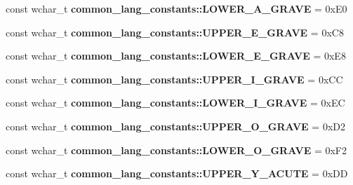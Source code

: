 \begin{DoxyCompactItemize}
\item 
\hypertarget{group___indexing_gad683b154d045922a0a5de25e7c837ec4}{const wchar\-\_\-t {\bfseries common\-\_\-lang\-\_\-constants\-::\-L\-O\-W\-E\-R\-\_\-\-A\-\_\-\-G\-R\-A\-V\-E} = 0x\-E0}\label{group___indexing_gad683b154d045922a0a5de25e7c837ec4}

\item 
\hypertarget{group___indexing_ga662a573a962fa386fa070e78055c5a67}{const wchar\-\_\-t {\bfseries common\-\_\-lang\-\_\-constants\-::\-U\-P\-P\-E\-R\-\_\-\-E\-\_\-\-G\-R\-A\-V\-E} = 0x\-C8}\label{group___indexing_ga662a573a962fa386fa070e78055c5a67}

\item 
\hypertarget{group___indexing_gad06e4b2ecd54bb7e694f66301c641c3c}{const wchar\-\_\-t {\bfseries common\-\_\-lang\-\_\-constants\-::\-L\-O\-W\-E\-R\-\_\-\-E\-\_\-\-G\-R\-A\-V\-E} = 0x\-E8}\label{group___indexing_gad06e4b2ecd54bb7e694f66301c641c3c}

\item 
\hypertarget{group___indexing_gabd5696c94be07f8ec253c01e4c5d7298}{const wchar\-\_\-t {\bfseries common\-\_\-lang\-\_\-constants\-::\-U\-P\-P\-E\-R\-\_\-\-I\-\_\-\-G\-R\-A\-V\-E} = 0x\-C\-C}\label{group___indexing_gabd5696c94be07f8ec253c01e4c5d7298}

\item 
\hypertarget{group___indexing_ga0825b012be345e06291b93ae5ad56f61}{const wchar\-\_\-t {\bfseries common\-\_\-lang\-\_\-constants\-::\-L\-O\-W\-E\-R\-\_\-\-I\-\_\-\-G\-R\-A\-V\-E} = 0x\-E\-C}\label{group___indexing_ga0825b012be345e06291b93ae5ad56f61}

\item 
\hypertarget{group___indexing_ga39e8650e073a63556b09e389c17175e9}{const wchar\-\_\-t {\bfseries common\-\_\-lang\-\_\-constants\-::\-U\-P\-P\-E\-R\-\_\-\-O\-\_\-\-G\-R\-A\-V\-E} = 0x\-D2}\label{group___indexing_ga39e8650e073a63556b09e389c17175e9}

\item 
\hypertarget{group___indexing_ga5e7dc4a09ae39860f8aaa48a0b98b4ce}{const wchar\-\_\-t {\bfseries common\-\_\-lang\-\_\-constants\-::\-L\-O\-W\-E\-R\-\_\-\-O\-\_\-\-G\-R\-A\-V\-E} = 0x\-F2}\label{group___indexing_ga5e7dc4a09ae39860f8aaa48a0b98b4ce}

\item 
\hypertarget{group___indexing_ga1b4f4cd0bc6b78681984a17c9fc26e0e}{const wchar\-\_\-t {\bfseries common\-\_\-lang\-\_\-constants\-::\-U\-P\-P\-E\-R\-\_\-\-Y\-\_\-\-A\-C\-U\-T\-E} = 0x\-D\-D}\label{group___indexing_ga1b4f4cd0bc6b78681984a17c9fc26e0e}


\end{DoxyCompactItemize}
